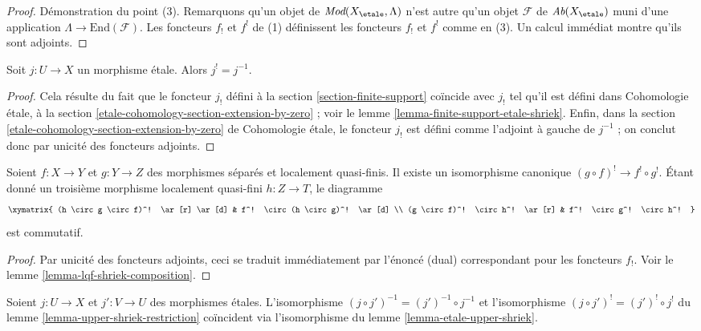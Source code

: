 \begin{proof}
\medskip\noindent
Démonstration du point (3). Remarquons qu'un objet de $\textit{Mod}(X_\etale, \Lambda)$
n'est autre qu'un objet $\mathcal{F}$ de $\textit{Ab}(X_\etale)$
muni d'une application $\Lambda \to \text{End}(\mathcal{F})$. Les
foncteurs $f_!$ et $f^!$ de (1) définissent les foncteurs $f_!$ et $f^!$ comme en (3).
Un calcul immédiat montre qu'ils sont adjoints.
\end{proof}

\begin{lemma}
\label{lemma-etale-upper-shriek}
Soit $j : U \to X$ un morphisme étale. Alors $j^! = j^{-1}$.
\end{lemma}

\begin{proof}
Cela résulte du fait que le foncteur $j_!$ défini à la
section \ref{section-finite-support}
coïncide avec $j_!$ tel qu'il est défini dans Cohomologie étale, à la section
\ref{etale-cohomology-section-extension-by-zero} ; voir le
lemme \ref{lemma-finite-support-etale-shriek}. Enfin, dans la
section \ref{etale-cohomology-section-extension-by-zero} de Cohomologie étale,
le foncteur $j_!$ est défini
comme l'adjoint à gauche de $j^{-1}$ ; on conclut donc par
unicité des foncteurs adjoints.
\end{proof}

\begin{lemma}
\label{lemma-upper-shriek-restriction}
Soient $f : X \to Y$ et $g : Y \to Z$ des morphismes séparés et localement
quasi-finis. Il existe un isomorphisme canonique $(g \circ f)^! \to f^! \circ g^!$.
Étant donné un troisième morphisme localement quasi-fini $h : Z \to T$,
le diagramme
$$
\xymatrix{
(h \circ g \circ f)^! \ar[r] \ar[d] &
f^! \circ (h \circ g)^! \ar[d] \\
(g \circ f)^! \circ h^! \ar[r] & f^! \circ g^! \circ h^!
}
$$
est commutatif.
\end{lemma}

\begin{proof}
Par unicité des foncteurs adjoints, ceci se traduit immédiatement
par l'énoncé (dual) correspondant pour les foncteurs $f_!$.
Voir le lemme \ref{lemma-lqf-shriek-composition}.
\end{proof}

\begin{lemma}
\label{lemma-upper-shriek-restriction-etale}
Soient $j : U \to X$ et $j' : V \to U$ des morphismes étales.
L'isomorphisme $(j \circ j')^{-1} = (j')^{-1} \circ j^{-1}$
et l'isomorphisme $(j \circ j')^! = (j')^! \circ j^!$ du
lemme \ref{lemma-upper-shriek-restriction}
coïncident via l'isomorphisme du lemme \ref{lemma-etale-upper-shriek}.
\end{lemma}

